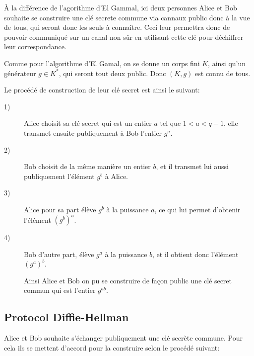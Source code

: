 À la différence de l'agorithme d'El Gammal, ici deux personnes Alice et Bob souhaite se construire une clé secrete commune via cannaux public donc à la vue de tous, qui seront donc les seuls à connaître. Ceci leur permettra donc de pouvoir communiqué sur un canal non sûr en utilisant cette clé pour déchiffrer leur correspondance.

Comme pour l'algorithme d'El Gamal, on se donne un corps fini $K$, ainsi qu'un générateur $g \in K^{*}$, qui seront tout deux public. Donc $(K,g)$ est connu de tous.

Le procédé de construction de leur clé secret est ainsi le suivant:

\begin{description}
    \item[1)] Alice choisit sa clé secret qui est un entier $a$ tel que $1<a<q-1$, elle transmet ensuite publiquement à Bob l'entier $g^{a}$.

    \item[2)] Bob choisit de la même manière un entier $b$, et il transmet lui aussi publiquement l'élément $g^{b}$ à Alice.

    \item[3)] Alice pour sa part élève $g^{b}$ à la puissance $a$, ce qui lui permet d'obtenir l'élément $(g^{b})^{a}$.

    \item[4)] Bob d'autre part, élève $g^{a}$ à la puissance $b$, et il obtient donc l'élément $(g^{a})^{b}$.

        Ainsi Alice et Bob on pu se construire de façon public une clé secret commun qui est l'entier $g^{ab}$.
\end{description}


\subsection{Protocol Diffie-Hellman}

Alice et Bob souhaite s'échanger publiquement une clé secrète commune. Pour cela ils se mettent d'accord pour la construire selon le procédé suivant:

